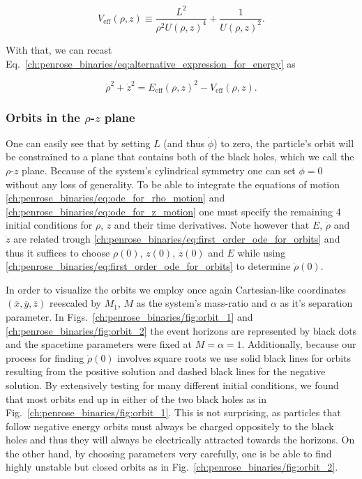 \begin{equation}
  V_{\text{eff}}(\rho,z) \equiv \frac{L^2}{\rho^2 U(\rho,z)^4} + \frac{1}{U(\rho,z)^2}.
  \label{ch:penrose_binaries/eq:effective_potential_definition}
\end{equation}

With that, we can recast Eq.~\eqref{ch:penrose_binaries/eq:alternative_expression_for_energy} as

\begin{equation}
  \dot{\rho}^2 + \dot{z}^2 = E_{\text{eff}}(\rho,z)^2 - V_{\text{eff}}(\rho,z).
  \label{ch:penrose_binaries/eq:first_order_ode_for_orbits}
\end{equation}

\subsubsection{Orbits in the \texorpdfstring{$\rho$}{$\symit{rho}$}-$z$ plane}

One can easily see that by setting $L$ (and thus $\dot{\phi}$) to zero, the particle's orbit will be constrained to a plane that contains both of the black holes, which we call the $\rho$-$z$ plane. Because of the system's cylindrical symmetry one can set $\phi = 0$ without any loss of generality. To be able to integrate the equations of motion \eqref{ch:penrose_binaries/eq:ode_for_rho_motion} and \eqref{ch:penrose_binaries/eq:ode_for_z_motion} one must specify the remaining 4 initial conditions for $\rho$, $z$ and their time derivatives. Note however that $E$, $\dot{\rho}$ and $\dot{z}$ are related trough \eqref{ch:penrose_binaries/eq:first_order_ode_for_orbits} and thus it suffices to choose $\rho(0)$, $z(0)$, $\dot{z}(0)$ and $E$ while using \eqref{ch:penrose_binaries/eq:first_order_ode_for_orbits} to determine $\dot{\rho}(0)$.

In order to visualize the orbits we employ once again Cartesian-like coordinates $(\overline{x},\overline{y},\overline{z})$ reescaled by $M_1$, $M$ as the system's mass-ratio and $\alpha$ as it's separation parameter. In Figs.~\ref{ch:penrose_binaries/fig:orbit_1} and \ref{ch:penrose_binaries/fig:orbit_2} the event horizons are represented by black dots and the spacetime parameters were fixed at $M = \alpha = 1$. Additionally, because our process for finding $\dot{\rho}(0)$ involves square roots we use solid black lines for orbits resulting from the positive solution and dashed black lines for the negative solution. By extensively testing for many different initial conditions, we found that most orbits end up in either of the two black holes as in Fig.~\ref{ch:penrose_binaries/fig:orbit_1}. This is not surprising, as particles that follow negative energy orbits must always be charged oppositely to the black holes and thus they will always be electrically attracted towards the horizons. On the other hand, by choosing parameters very carefully, one is be able to find highly unstable but closed orbits as in Fig.~\ref{ch:penrose_binaries/fig:orbit_2}.

